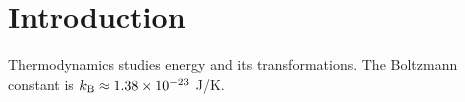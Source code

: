 \section{Introduction}\label{sec:intro}
Thermodynamics studies energy and its transformations. The Boltzmann constant is $k_{\mathrm{B}} \approx 1.38\times10^{-23}$ J/K.
